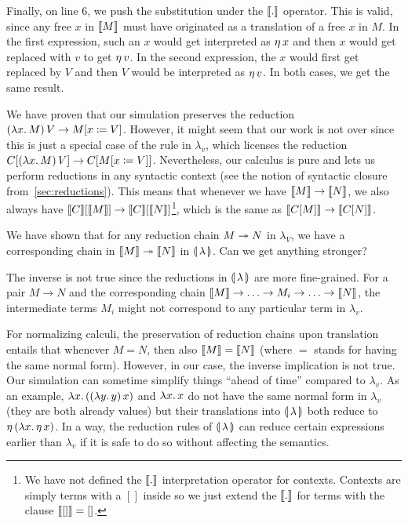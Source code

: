 Finally, on line 6, we push the substitution under the $\llbracket . \rrbracket$
operator. This is valid, since any free $x$ in $\llbracket M \rrbracket$ must have
originated as a translation of a free $x$ in $M$. In the first expression,
such an $x$ would get interpreted as $\eta\,x$ and then $x$ would get
replaced with $v$ to get $\eta\,v$. In the second expression, the $x$
would first get replaced by $V$ and then $V$ would be interpreted as
$\eta\,v$. In both cases, we get the same result.

We have proven that our simulation preserves the reduction
$(\lambda x.\, M)\,V \to M[x \coloneqq V]$. However, it might seem that our
work is not over since this is just a special case of the rule in
$\lambda_v$, which licenses the reduction $C[(\lambda x.\, M)\,V] \to
C[M[x \coloneqq V]]$. Nevertheless, our calculus is pure and lets us perform
reductions in any syntactic context (see the notion of syntactic closure
from~\ref{sec:reductions}). This means that whenever we have $\llbracket M \rrbracket \to
\llbracket N \rrbracket$, we also always have $\llbracket C \rrbracket[\llbracket M \rrbracket] \to
\llbracket C \rrbracket[\llbracket N \rrbracket]$\footnote{We have not defined the $\llbracket . \rrbracket$ interpretation
  operator for contexts. Contexts are simply terms with a $[]$ inside so we
  just extend the $\llbracket . \rrbracket$ for terms with the clause $\llbracket [] \rrbracket = []$.},
which is the same as $\llbracket C[M] \rrbracket \to \llbracket C[N] \rrbracket$.

We have shown that for any reduction chain $M \twoheadrightarrow N$ in $\lambda_V$, we
have a corresponding chain in $\llbracket M \rrbracket \twoheadrightarrow \llbracket N \rrbracket$ in
$\llparenthesis \, \lambda \, \rrparenthesis$. Can we get anything stronger?

The inverse is not true since the reductions in $\llparenthesis \, \lambda \, \rrparenthesis$ are more
fine-grained. For a pair $M \to N$ and the corresponding chain $\llbracket M \rrbracket \to
\ldots \to M_i \to \ldots \to \llbracket N \rrbracket$, the intermediate terms $M_i$ might
not correspond to any particular term in $\lambda_v$.

For normalizing calculi, the preservation of reduction chains upon
translation entails that whenever $M = N$, then also $\llbracket M \rrbracket = \llbracket N \rrbracket$
(where $=$ stands for having the same normal form). However, in our case,
the inverse implication is not true. Our simulation can sometime simplify
things ``ahead of time'' compared to $\lambda_v$. As an example,
$\lambda x.\, ((\lambda y.\, y)\,x)$ and $\lambda x.\, x$ do not have the same
normal form in $\lambda_v$ (they are both already values) but their
translations into $\llparenthesis \, \lambda \, \rrparenthesis$ both reduce to
$\eta\,(\lambda x.\, \eta\,x)$. In a way, the reduction rules of
$\llparenthesis \, \lambda \, \rrparenthesis$ can reduce certain expressions earlier than $\lambda_v$
if it is safe to do so without affecting the semantics.


